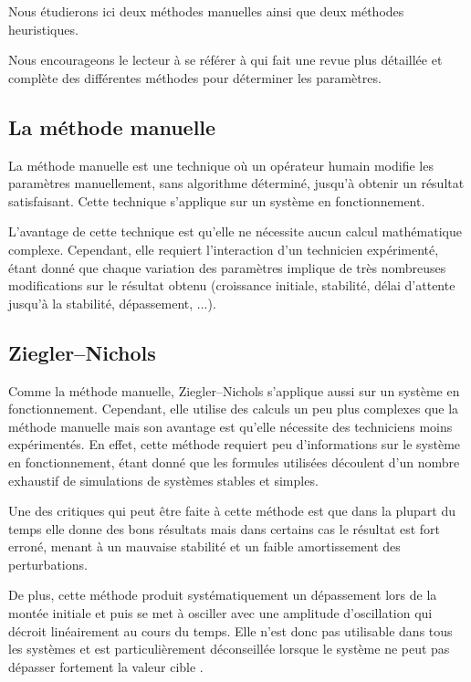 \documentclass[a4paper,10pt]{report}
\begin{document}
Nous étudierons ici deux méthodes manuelles ainsi que deux méthodes heuristiques.

Nous encourageons le lecteur à se référer à \cite{shahrokhi2013comparison} qui fait une revue plus détaillée et complète des différentes méthodes pour déterminer les paramètres.


\subsection{La méthode manuelle}

La méthode manuelle est une technique où un opérateur humain modifie les paramètres manuellement, sans algorithme déterminé, jusqu'à obtenir un résultat satisfaisant. Cette technique s'applique sur un système en fonctionnement.

L'avantage de cette technique est qu'elle ne nécessite aucun calcul mathématique complexe. Cependant, elle requiert l'interaction d'un technicien expérimenté, étant donné que chaque variation des paramètres implique de très nombreuses modifications sur le résultat obtenu (croissance initiale, stabilité, délai d'attente jusqu'à la stabilité, dépassement, ...). \cite{zhong2006pid}


\subsection{Ziegler–Nichols}
Comme la méthode manuelle, Ziegler–Nichols s'applique aussi sur un système en fonctionnement. Cependant, elle utilise des calculs un peu plus complexes que la méthode manuelle mais son avantage est qu'elle nécessite des techniciens moins expérimentés.\cite{ziegler1942optimum}
En effet, cette méthode requiert peu d'informations sur le système en fonctionnement, étant donné que les formules utilisées découlent d'un nombre exhaustif de simulations de systèmes stables et simples. \cite{silva2007pid}

Une des critiques qui peut être faite à cette méthode est que dans la plupart du temps elle donne des bons résultats mais dans certains cas le résultat est fort erroné,
menant à un mauvaise stabilité et un faible amortissement des perturbations.

De plus, cette méthode produit systématiquement un dépassement lors de la montée initiale et
puis se met à osciller avec une amplitude d'oscillation qui décroit linéairement au cours du temps.
Elle n'est donc pas utilisable dans tous les systèmes
 et est particulièrement déconseillée lorsque le système ne peut pas dépasser fortement la valeur cible \cite{silva2007pid}.
\end{document}
